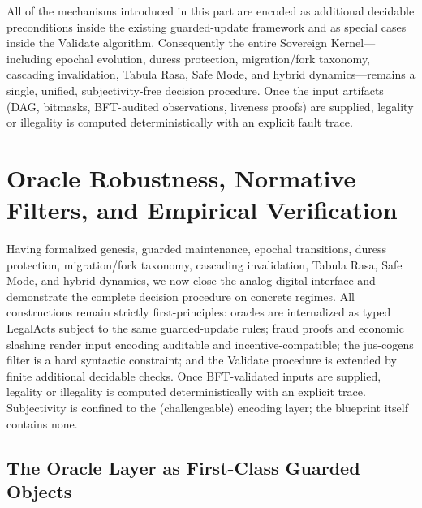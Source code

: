 \documentclass[11pt,a4paper]{article}
\begin{document}
All of the mechanisms introduced in this part are encoded as additional decidable preconditions inside the existing guarded-update framework and as special cases inside the Validate algorithm. Consequently the entire Sovereign Kernel---including epochal evolution, duress protection, migration/fork taxonomy, cascading invalidation, Tabula Rasa, Safe Mode, and hybrid dynamics---remains a single, unified, subjectivity-free decision procedure. Once the input artifacts (DAG, bitmasks, BFT-audited observations, liveness proofs) are supplied, legality or illegality is computed deterministically with an explicit fault trace.

\section{Oracle Robustness, Normative Filters, and Empirical Verification}

Having formalized genesis, guarded maintenance, epochal transitions, duress protection, migration/fork taxonomy, cascading invalidation, Tabula Rasa, Safe Mode, and hybrid dynamics, we now close the analog-digital interface and demonstrate the complete decision procedure on concrete regimes. All constructions remain strictly first-principles: oracles are internalized as typed LegalActs subject to the same guarded-update rules; fraud proofs and economic slashing render input encoding auditable and incentive-compatible; the jus-cogens filter is a hard syntactic constraint; and the Validate procedure is extended by finite additional decidable checks. Once BFT-validated inputs are supplied, legality or illegality is computed deterministically with an explicit trace. Subjectivity is confined to the (challengeable) encoding layer; the blueprint itself contains none.

\subsection{The Oracle Layer as First-Class Guarded Objects}
\end{document}
